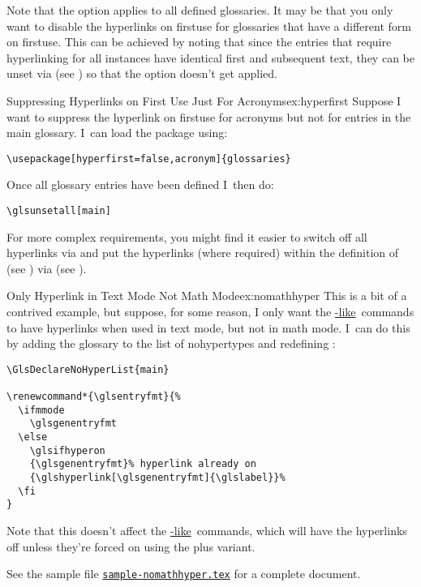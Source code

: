 \documentclass[report,inlinetitle]{nlctdoc}
\newcommand{\glslike}{\hyperref[sec:gls-like]{\cs{gls}-like}}
\newcommand{\glstextlike}{\hyperref[sec:glstext-like]{\cs{glstext}-like}}
\newcounter{sample}
\newcommand*{\samplefile}[2][sample]{%
  \hyperref[ex:#1#2]{\texttt{#1#2.tex}}}
\begin{document}
Note that the  option applies to all defined glossaries.  It
may be that you only want to disable the hyperlinks on
\gls{firstuse} for glossaries that have a different form on
\gls*{firstuse}. This can be achieved by noting that since the
entries that require hyperlinking for all instances have identical
first and subsequent text, they can be unset via 
(see ) so that the 
option doesn't get applied.

\begin{example}{Suppressing Hyperlinks on First Use Just For
Acronyms}{ex:hyperfirst}
Suppose I want to suppress the hyperlink on \gls{firstuse} for
acronyms but not for entries in the main glossary.  I~can load
the  package using:
\begin{verbatim}
\usepackage[hyperfirst=false,acronym]{glossaries}
\end{verbatim}
Once all glossary entries have been defined I~then do:
\begin{verbatim}
\glsunsetall[main]
\end{verbatim}

\end{example}

For more complex requirements, you might find it easier to switch
off all hyperlinks via  and put the hyperlinks
(where required) within the definition of  (see
) via  (see
).

\begin{example}{Only Hyperlink in Text Mode Not Math
Mode}{ex:nomathhyper}
This is a bit of a contrived example, but suppose, for some reason,
I only want the \glslike\ commands to have
hyperlinks when used in text mode, but not in math mode. I~can do
this by adding the glossary to the list of nohypertypes and redefining 
:
\begin{verbatim}
\GlsDeclareNoHyperList{main}

\renewcommand*{\glsentryfmt}{%
  \ifmmode
    \glsgenentryfmt
  \else
    \glsifhyperon
    {\glsgenentryfmt}% hyperlink already on
    {\glshyperlink[\glsgenentryfmt]{\glslabel}}%
  \fi
}
\end{verbatim}
Note that this doesn't affect the \glstextlike\ commands, which will
have the hyperlinks off unless they're forced on using the plus
variant.

See the sample file \samplefile{-nomathhyper} for a complete
document.
\end{example}
\end{document}
